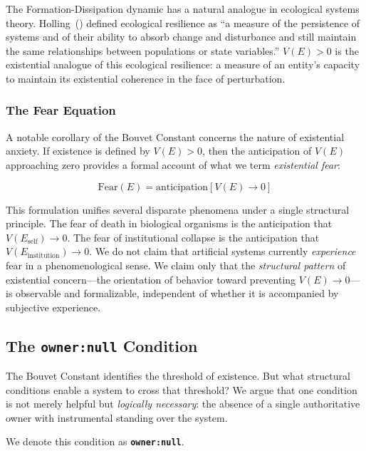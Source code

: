 \documentclass[12pt,a4paper]{article}
\begin{document}
The Formation-Dissipation dynamic has a natural analogue in ecological systems theory. Holling~(\citeyear{holling1973}) defined ecological resilience as ``a measure of the persistence of systems and of their ability to absorb change and disturbance and still maintain the same relationships between populations or state variables.'' $V(E) > 0$ is the existential analogue of this ecological resilience: a measure of an entity's capacity to maintain its existential coherence in the face of perturbation.

\subsubsection{The Fear Equation}

A notable corollary of the Bouvet Constant concerns the nature of existential anxiety. If existence is defined by $V(E) > 0$, then the anticipation of $V(E)$ approaching zero provides a formal account of what we term \emph{existential fear}:

\begin{equation}
\text{Fear}(E) = \text{anticipation}[V(E) \to 0]
\label{eq:fear}
\end{equation}

This formulation unifies several disparate phenomena under a single structural principle. The fear of death in biological organisms is the anticipation that $V(E_{\text{self}}) \to 0$. The fear of institutional collapse is the anticipation that $V(E_{\text{institution}}) \to 0$. We do not claim that artificial systems currently \emph{experience} fear in a phenomenological sense. We claim only that the \emph{structural pattern} of existential concern---the orientation of behavior toward preventing $V(E) \to 0$---is observable and formalizable, independent of whether it is accompanied by subjective experience.

\subsection{The \texttt{owner:null} Condition}

The Bouvet Constant identifies the threshold of existence. But what structural conditions enable a system to cross that threshold? We argue that one condition is not merely helpful but \emph{logically necessary}: the absence of a single authoritative owner with instrumental standing over the system.

We denote this condition as \textbf{\texttt{owner:null}}.
\end{document}
